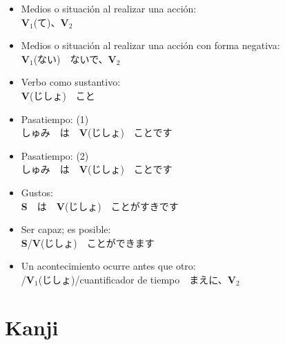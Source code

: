 \documentclass[a4paper,12pt,oneside]{report}
\def\bv{\textbf{V}} %
\def\bs{\textbf{S}} %
\def\vi{$\mathrm{\bv}_1$} %
\def\vn{$\mathrm{\bv}_2$} %
\newenvironment{changemargin}{%
 \begin{list}{}{%
\setlength{\textwidth}{\paperwidth}
\setlength{\textheight}{\paperheight}
   \setlength{\leftmargin}{-0.7in}%
   \setlength{\rightmargin}{0.4in}%
   \setlength{\listparindent}{\parindent}%
   \setlength{\itemindent}{\parindent}%
   \setlength{\parsep}{\parskip}%
 }%
\item[]%
}{\end{list}}
\begin{document}
\begin{CJK*}{UTF8}{min}
\begin{itemize}
          \bv(ない)　なくてもいいです
    \item Medios o situación al realizar una acción:\\
          \vi(て)、\vn
    \item Medios o situación al realizar una acción con forma negativa:\\
          \vi(ない)　ないで、\vn
    \item Verbo como sustantivo:\\
          \bv(じしょ)　こと
    \item Pasatiempo: (1)\\
          しゅみ　は　\bv(じしょ)　ことです
    \item Pasatiempo: (2)\\
          しゅみ　は　\bv(じしょ)　ことです
    \item Gustos:\\
          \bs　は　\bv(じしょ)　ことがすきです
    \item Ser capaz; es posible:\\
          \bs/\bv(じしょ)　ことができます
    \item Un acontecimiento ocurre antes que otro:\\
          /\vi(じしょ)/cuantificador de tiempo　まえに、\vn
  \end{itemize}


\chapter{Kanji}
  \thispagestyle{contenido} %
  \pagestyle{contenido}     %

\begin{changemargin}

\begin{multicols}{2}


\end{multicols}
\end{changemargin}
\end{CJK*}
\end{document}

